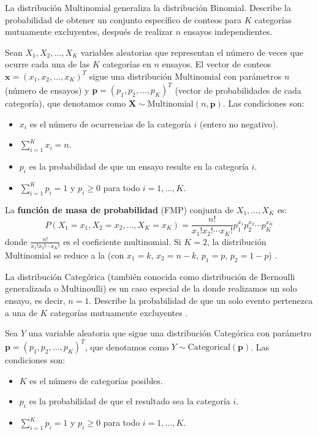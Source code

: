 \begin{definition}
\label{def:multinomial_distribution}
La distribución Multinomial generaliza la distribución Binomial. Describe la probabilidad de obtener un conjunto específico de conteos para $K$ categorías mutuamente excluyentes, después de realizar $n$ ensayos independientes.

Sean $X_1, X_2, \ldots, X_K$ variables aleatorias que representan el número de veces que ocurre cada una de las $K$ categorías en $n$ ensayos. El vector de conteos $\mathbf{x} = (x_1, x_2, \ldots, x_K)^T$ sigue una distribución Multinomial con parámetros $n$ (número de ensayos) y $\mathbf{p} = (p_1, p_2, \ldots, p_K)^T$ (vector de probabilidades de cada categoría), que denotamos como $\mathbf{X} \sim \text{Multinomial}(n, \mathbf{p})$.
Las condiciones son:
\begin{itemize}
    \item $x_i$ es el número de ocurrencias de la categoría $i$ (entero no negativo).
    \item $\sum_{i=1}^{K} x_i = n$.
    \item $p_i$ es la probabilidad de que un ensayo resulte en la categoría $i$.
    \item $\sum_{i=1}^{K} p_i = 1$ y $p_i \ge 0$ para todo $i=1, \ldots, K$.
\end{itemize}
La \textbf{función de masa de probabilidad} (FMP) conjunta de $X_1, \ldots, X_K$ es:
\[ P(X_1=x_1, X_2=x_2, \ldots, X_K=x_K) = \frac{n!}{x_1! x_2! \cdots x_K!} p_1^{x_1} p_2^{x_2} \cdots p_K^{x_K} \]
donde $\frac{n!}{x_1! x_2! \cdots x_K!}$ es el coeficiente multinomial.
Si $K=2$, la distribución Multinomial se reduce a la  (con $x_1=k$, $x_2=n-k$, $p_1=p$, $p_2=1-p$) \citep{CasellaBerger2002}.
\end{definition}

\begin{definition}
\label{def:categorical_distribution}
La distribución Categórica (también conocida como distribución de Bernoulli generalizada o Multinoulli) es un caso especial de la  donde realizamos un solo ensayo, es decir, $n=1$. Describe la probabilidad de que un solo evento pertenezca a una de $K$ categorías mutuamente excluyentes \citep{Bishop2006}.

Sea $Y$ una variable aleatoria que sigue una distribución Categórica con parámetro $\mathbf{p} = (p_1, p_2, \ldots, p_K)^T$, que denotamos como $Y \sim \text{Categorical}(\mathbf{p})$.
Las condiciones son:
\begin{itemize}
    \item $K$ es el número de categorías posibles.
    \item $p_i$ es la probabilidad de que el resultado sea la categoría $i$.
    \item $\sum_{i=1}^{K} p_i = 1$ y $p_i \ge 0$ para todo $i=1, \ldots, K$.
\end{itemize}
\end{definition}

